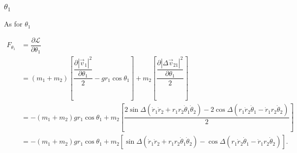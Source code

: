\documentclass[12pt,a4paper,portrait]{article}
\newcommand{\lag}{\mathcal{L}}
\begin{document}
\begin{landscape}
\subsubsection{$\theta_1$}
As for $\theta_1$

\begin{align*}
	F_{\theta_1} &= \dfrac{\partial \lag}{\partial \theta_1} \\
	&= (m_1+m_2)\left[\dfrac{\dfrac{\partial |\vec{v}_1|^2}{\partial \theta_1}}{2} - gr_1\cos{\theta_1}\right] + m_2\left[\dfrac{\dfrac{\partial |\Delta \vec{v}_{21}|^2}{\partial \theta_1}}{2}\right] \\
	&= -(m_1+m_2)gr_1\cos{\theta_1} + m_2\left[\dfrac{2\sin{\Delta}(\dot{r}_1\dot{r}_2 + r_1r_2\dot{\theta}_1\dot{\theta}_2) - 2\cos{\Delta}(r_1\dot{r}_2\dot{\theta}_1-\dot{r}_1r_2\dot{\theta}_2)}{2}\right] \\
	&= -(m_1+m_2)gr_1\cos{\theta_1} + m_2\left[\sin{\Delta}(\dot{r}_1\dot{r}_2 + r_1r_2\dot{\theta}_1\dot{\theta}_2) - \cos{\Delta}(r_1\dot{r}_2\dot{\theta}_1-\dot{r}_1r_2\dot{\theta}_2)\right].
\end{align*}


\end{landscape}
\end{document}

